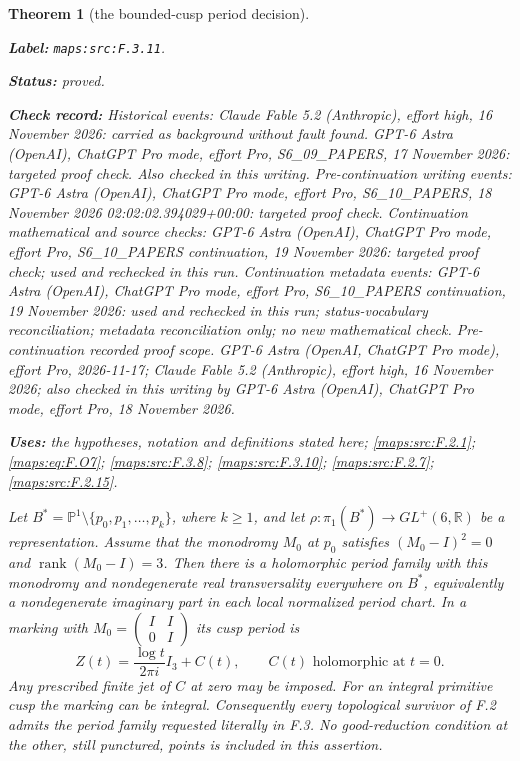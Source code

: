 \documentclass[11pt,a4paper]{article}
\newtheorem{theorem}{Theorem}[section]
\theoremstyle{definition}
\newcommand{\StatementRecord}[4]{\par\smallskip\begingroup\upshape\raggedright\noindent\textbf{Label:} \nolinkurl{#1}.\par\noindent\textbf{Status:} #2.\par\noindent\textbf{Check record:} #3.\par\noindent\textbf{Uses:} #4.\par\endgroup\smallskip}
\begin{document}
\begin{theorem}[the bounded-cusp period decision]\label{maps:src:F.3.11}
\StatementRecord{maps:src:F.3.11}{proved}{Historical events: Claude Fable 5.2 (Anthropic), effort high, 16 November 2026: carried as background without fault found. GPT-6 Astra (OpenAI), ChatGPT Pro mode, effort Pro, S6\_09\_PAPERS, 17 November 2026: targeted proof check. Also checked in this writing. Pre-continuation writing events: GPT-6 Astra (OpenAI), ChatGPT Pro mode, effort Pro, S6\_10\_PAPERS, 18 November 2026 02:02:02.394029+00:00: targeted proof check. Continuation mathematical and source checks: GPT-6 Astra (OpenAI), ChatGPT Pro mode, effort Pro, S6\_10\_PAPERS continuation, 19 November 2026: targeted proof check; used and rechecked in this run. Continuation metadata events: GPT-6 Astra (OpenAI), ChatGPT Pro mode, effort Pro, S6\_10\_PAPERS continuation, 19 November 2026: used and rechecked in this run; status-vocabulary reconciliation; metadata reconciliation only; no new mathematical check. \emph{Pre-continuation recorded proof scope.} GPT-6 Astra (OpenAI, ChatGPT Pro mode), effort Pro, 2026-11-17; Claude Fable 5.2 (Anthropic), effort high, 16 November 2026; also checked in this writing by GPT-6 Astra (OpenAI), ChatGPT Pro mode, effort Pro, 18 November 2026}{the hypotheses, notation and definitions stated here; \cref{maps:src:F.2.1}; \cref{maps:eq:F.O7}; \cref{maps:src:F.3.8}; \cref{maps:src:F.3.10}; \cref{maps:src:F.2.7}; \cref{maps:src:F.2.15}}


Let
$B^*=\mathbb P^1\setminus\{p_0,p_1,\ldots,p_k\}$,
where $k\ge1$, and let
$\rho:\pi_1(B^*)\to GL^+(6,\mathbb R)$ be a representation.
Assume that the monodromy $M_0$ at $p_0$ satisfies
$(M_0-I)^2=0$ and $\operatorname{rank}(M_0-I)=3$.
Then there is a holomorphic period family with this monodromy
and nondegenerate real transversality everywhere on $B^*$,
equivalently a nondegenerate imaginary part in each local
normalized period chart.
In a marking with $M_0=\left(\begin{smallmatrix}I&I\\0&I\end{smallmatrix}\right)$
its cusp period is
\[
 Z(t)=\frac{\log t}{2\pi i}I_3+C(t),
 \qquad C(t)\text{ holomorphic at }t=0.
 \tag{F.O6}\label{maps:eq:F.O6}
\]
Any prescribed finite jet of $C$ at zero may be imposed.
For an integral primitive cusp the marking can be integral.
Consequently every topological survivor of F.2 admits the
period family requested literally in F.3.  No good-reduction
condition at the other, still punctured, points is included
in this assertion.

\end{theorem}
\end{document}
